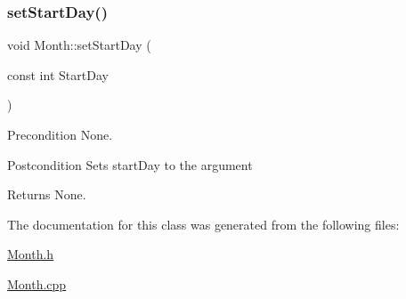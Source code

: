 \subsubsection{\texorpdfstring{set\+Start\+Day()}{setStartDay()}}
{\footnotesize\ttfamily void Month\+::set\+Start\+Day (\begin{DoxyParamCaption}\item[{const int}]{Start\+Day }\end{DoxyParamCaption})}

\begin{DoxyPrecond}{Precondition}
None. 
\end{DoxyPrecond}
\begin{DoxyPostcond}{Postcondition}
Sets start\+Day to the argument 
\end{DoxyPostcond}
\begin{DoxyReturn}{Returns}
None. 
\end{DoxyReturn}


The documentation for this class was generated from the following files\+:\begin{DoxyCompactItemize}
\item 
\hyperlink{_month_8h}{Month.\+h}\item 
\hyperlink{_month_8cpp}{Month.\+cpp}\end{DoxyCompactItemize}

